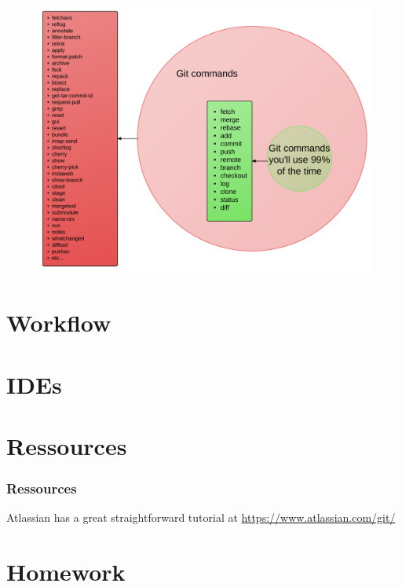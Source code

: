 \documentclass{beamer}
\begin{document}
\begin{frame}
    \begin{figure}[h!]
        \begin{center}
            \includegraphics[scale=0.09]{git_commands2.png}
        \end{center}
    \end{figure}
\end{frame}

\section{Workflow}

\section{IDEs}

\section{Ressources}

\begin{frame}
    \frametitle{Ressources}
    \begin{center}
        Atlassian has a great straightforward tutorial at
        \url{https://www.atlassian.com/git/}
    \end{center}
\end{frame}

\section{Homework}
\end{document}
